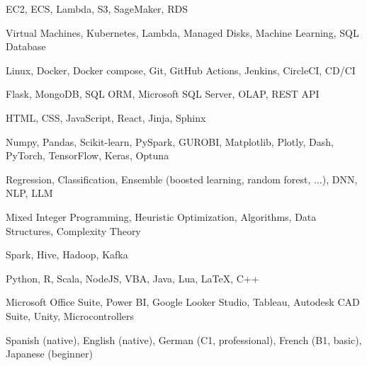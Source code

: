 

\begin{cvskills}

	{EC2, ECS, Lambda, S3, SageMaker, RDS} %

	{Virtual Machines, Kubernetes, Lambda, Managed Disks, Machine Learning, SQL Database} %

	{Linux, Docker, Docker compose, Git, GitHub Actions, Jenkins, CircleCI, CD/CI} %

	{Flask, MongoDB, SQL ORM, Microsoft SQL Server, OLAP, REST API} %

	{HTML, CSS, JavaScript, React, Jinja, Sphinx} %

	{Numpy, Pandas, Scikit-learn, PySpark, GUROBI, Matplotlib, Plotly, Dash, PyTorch, TensorFlow, Keras, Optuna} %

	{Regression, Classification, Ensemble (boosted learning, random forest, \(\dots\)), DNN, NLP, LLM} %

	{Mixed Integer Programming, Heuristic Optimization, Algorithms, Data Structures, Complexity Theory} %

	{Spark, Hive, Hadoop, Kafka} %

	{Python, R, Scala, NodeJS, VBA, Java, Lua, LaTeX, C++} %

	{Microsoft Office Suite, Power BI, Google Looker Studio, Tableau, Autodesk CAD Suite, Unity, Microcontrollers} %

	{Spanish (native), English (native), German (C1, professional), French (B1, basic), Japanese (beginner)} %

\end{cvskills}
